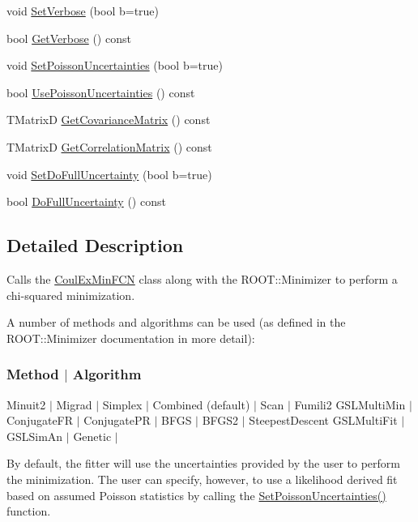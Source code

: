 \begin{DoxyCompactItemize}
\item 
void \hyperlink{classCoulExFitter_aadbcd260ffdc402f24c122a549f08743}{Set\-Verbose} (bool b=true)
\item 
bool \hyperlink{classCoulExFitter_ad7f2ed3a90a161d3d7f8eb6571649da6}{Get\-Verbose} () const 
\item 
void \hyperlink{classCoulExFitter_a9e577fdf18978a59a8a3059522ba7355}{Set\-Poisson\-Uncertainties} (bool b=true)
\item 
bool \hyperlink{classCoulExFitter_af2820d3ab13fcc8df1eaee486d58fb09}{Use\-Poisson\-Uncertainties} () const 
\item 
T\-Matrix\-D \hyperlink{classCoulExFitter_a6d59f4e8c05a18c285972ea722e7a503}{Get\-Covariance\-Matrix} () const 
\item 
T\-Matrix\-D \hyperlink{classCoulExFitter_aeda72e2dee8b0aa45157cb4562f9aab3}{Get\-Correlation\-Matrix} () const 
\item 
void \hyperlink{classCoulExFitter_aacc37bb66234dbd3f235683cad8e1427}{Set\-Do\-Full\-Uncertainty} (bool b=true)
\item 
bool \hyperlink{classCoulExFitter_a4fd09244f82e3af46add6960543524d9}{Do\-Full\-Uncertainty} () const 
\end{DoxyCompactItemize}


\subsection{Detailed Description}
Calls the \hyperlink{classCoulExMinFCN}{Coul\-Ex\-Min\-F\-C\-N} class along with the R\-O\-O\-T\-::\-Minimizer to perform a chi-\/squared minimization. 

A number of methods and algorithms can be used (as defined in the R\-O\-O\-T\-::\-Minimizer documentation in more detail)\-:

\subsubsection*{Method $|$ Algorithm }

Minuit2 $|$ Migrad $|$ Simplex $|$ Combined (default) $|$ Scan $|$ Fumili2 G\-S\-L\-Multi\-Min $|$ Conjugate\-F\-R $|$ Conjugate\-P\-R $|$ B\-F\-G\-S $|$ B\-F\-G\-S2 $|$ Steepest\-Descent G\-S\-L\-Multi\-Fit $|$ G\-S\-L\-Sim\-An $|$ Genetic $|$

By default, the fitter will use the uncertainties provided by the user to perform the minimization. The user can specify, however, to use a likelihood derived fit based on assumed Poisson statistics by calling the \hyperlink{classCoulExFitter_a9e577fdf18978a59a8a3059522ba7355}{Set\-Poisson\-Uncertainties()} function.

